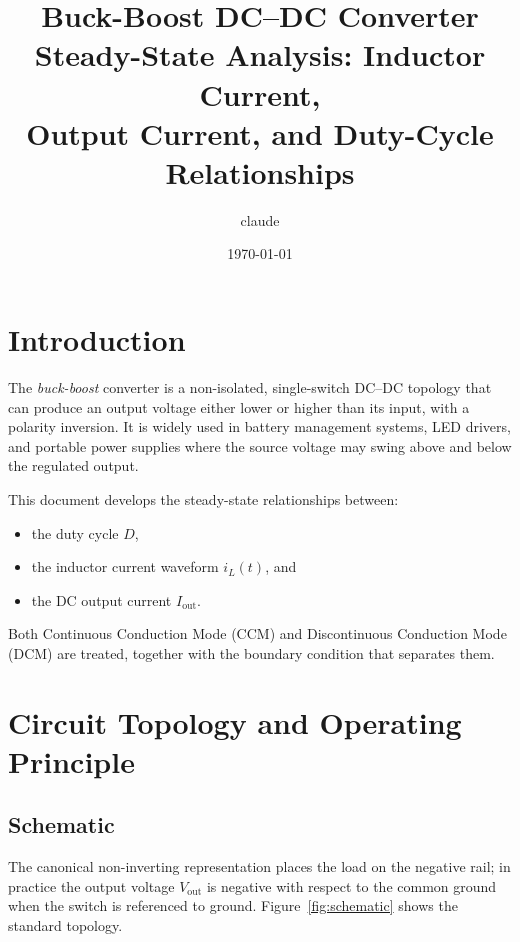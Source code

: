 \documentclass[12pt,a4paper]{article}
\title{%
  \textbf{Buck-Boost DC--DC Converter}\\[4pt]
  \large Steady-State Analysis: Inductor Current,\\
  Output Current, and Duty-Cycle Relationships
}
\author{claude}
\date{\today}
\newcommand{\Vout}{V_{\mathrm{out}}}
\newcommand{\Iout}{I_{\mathrm{out}}}
\newcommand{\Dduty}{D}
\begin{document}
\maketitle
\tableofcontents
\newpage

\section{Introduction}
\label{sec:intro}

The \emph{buck-boost} converter is a non-isolated, single-switch DC--DC
topology that can produce an output voltage either lower or higher than its
input, with a polarity inversion.
It is widely used in battery management systems, LED drivers, and portable
power supplies where the source voltage may swing above and below the
regulated output.

This document develops the steady-state relationships between:
\begin{itemize}
  \item the duty cycle $\Dduty$,
  \item the inductor current waveform $i_L(t)$, and
  \item the DC output current $\Iout$.
\end{itemize}

Both Continuous Conduction Mode (CCM) and Discontinuous Conduction Mode
(DCM) are treated, together with the boundary condition that separates them.

\section{Circuit Topology and Operating Principle}
\label{sec:topology}

\subsection{Schematic}

The canonical non-inverting representation places the load on the negative
rail; in practice the output voltage $\Vout$ is negative with respect to the
common ground when the switch is referenced to ground.
Figure~\ref{fig:schematic} shows the standard topology.
\end{document}
